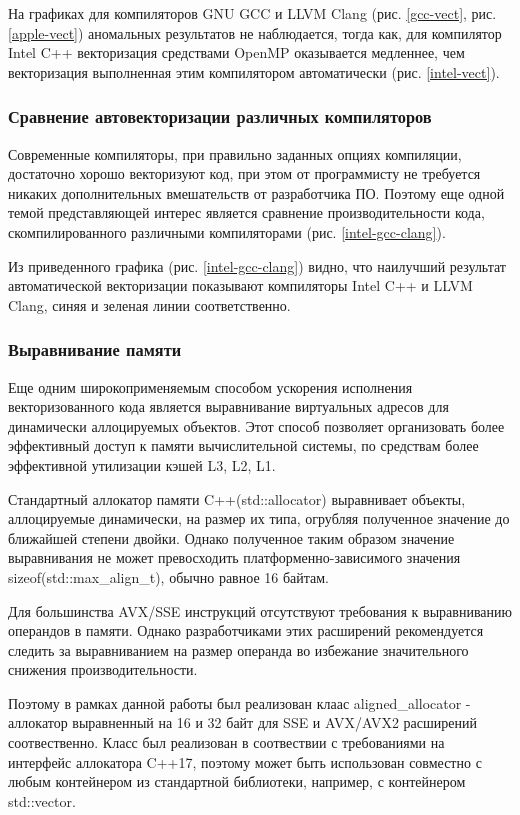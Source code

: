 На графиках для компиляторов GNU GCC и LLVM Clang (рис. \ref{gcc-vect}, рис. \ref{apple-vect}) аномальных результатов не наблюдается,
тогда как, для компилятор Intel C++ векторизация средствами OpenMP оказывается медленнее, чем векторизация выполненная
этим компилятором автоматически (рис. \ref{intel-vect}).

\subsubsection{Сравнение автовекторизации различных компиляторов}

Современные компиляторы, при правильно заданных опциях компиляции, достаточно хорошо векторизуют код,
при этом от программисту не требуется никаких дополнительных вмешательств от разработчика ПО.
Поэтому еще одной темой представляющей интерес является сравнение производительности кода,
скомпилированного различными компиляторами (рис. \ref{intel-gcc-clang}).


Из приведенного графика (рис. \ref{intel-gcc-clang}) видно, что наилучший результат автоматической векторизации показывают
компиляторы Intel C++ и LLVM Clang, синяя и зеленая линии соответственно.

\subsubsection{Выравнивание памяти}

Еще одним широкоприменяемым способом ускорения исполнения векторизованного кода является выравнивание виртуальных адресов
для динамически аллоцируемых объектов. Этот способ позволяет организовать более эффективный доступ к памяти вычислительной системы,
по средствам более эффективной утилизации кэшей L3, L2, L1.

Стандартный аллокатор памяти C++(std::allocator) выравнивает объекты, аллоцируемые динамически, на размер их типа,
огрубляя полученное значение до ближайшей степени двойки.
Однако полученное таким образом значение выравнивания не может превосходить платформенно-зависимого значения sizeof(std::max\_align\_t),
обычно равное 16 байтам.

Для большинства AVX/SSE инструкций отсутствуют требования к выравниванию операндов в памяти. 
Однако разработчиками этих расширений рекомендуется следить за выравниванием на размер операнда
во избежание значительного снижения производительности.

Поэтому в рамках данной работы был реализован клаас aligned\_allocator - аллокатор выравненный
на 16 и 32 байт для SSE и AVX/AVX2 расширений соотвественно.
Класс был реализован в соотвествии с требованиями на интерфейс аллокатора C++17, поэтому может быть использован совместно с любым
контейнером из стандартной библиотеки, например, с контейнером std::vector.

\clearpage
